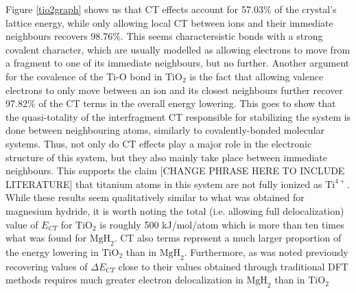 \documentclass[aps,prb,twocolumn,amsmath,amssymb,superscriptaddress,longbibliography]{revtex4-1}
\newcommand{\N}{\mathbb{N}}
\newcommand{\C}{\mathbb{C}}
\begin{document}
Figure \ref{tio2graph} shows us that CT effects account for 57.03\% of the crystal's lattice energy, while only allowing local CT between ions and their immediate neighbours recovers 98.76\%. This seems charactersistic bonds with a strong covalent character, which are usually modelled as allowing electrons to move from a fragment to one of its immediate neighbours, but no further. 
Another argument for the covalence of the Ti-O bond in $\text{TiO}_{2}$ is the fact that allowing valence electrons to only move between an ion and its closest neighbours further recover 97.82\% of the CT terms in the overall energy lowering. This goes to show that the quasi-totality of the interfragment CT responsible for stabilizing the system is done between neighbouring atoms, similarly to covalently-bonded molecular systems. Thus, not only do CT effects play a major role in the electronic structure of this system, but they also mainly take place between immediate neighbours. 
 This supports the claim [CHANGE PHRASE HERE TO INCLUDE LITERATURE] that titanium atoms in this system are not fully ionized as $\text{Ti}^{4+}$.\\

While these results seem qualitatively similar to what was obtained for magnesium hydride, it is worth noting the total (i.e. allowing full delocalization) value of $E_{CT}$ for $\text{TiO}_{2}$ is roughly 500 kJ/mol/atom which is more than ten times what was found for $\text{MgH}_{2}$. CT also terms represent a much larger proportion of the energy lowering in $\text{TiO}_{2}$ than in $\text{MgH}_{2}$. Furthermore, as was noted previously recovering values of $\Delta E_{CT}$ close to their values obtained through traditional DFT methods requires much greater electron delocalization in $\text{MgH}_{2}$ than in $\text{TiO}_{2}$
  














\end{document}
